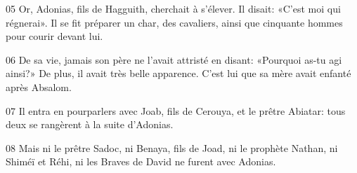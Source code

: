 
05 Or, Adonias, fils de Hagguith, cherchait à s’élever. Il disait: «C’est moi qui régnerai». Il se fit préparer un char, des cavaliers, ainsi que cinquante hommes pour courir devant lui.

06 De sa vie, jamais son père ne l’avait attristé en disant: «Pourquoi as-tu agi ainsi?» De plus, il avait très belle apparence. C’est lui que sa mère avait enfanté après Absalom.

07 Il entra en pourparlers avec Joab, fils de Cerouya, et le prêtre Abiatar: tous deux se rangèrent à la suite d’Adonias.

08 Mais ni le prêtre Sadoc, ni Benaya, fils de Joad, ni le prophète Nathan, ni Shiméï et Réhi, ni les Braves de David ne furent avec Adonias.
